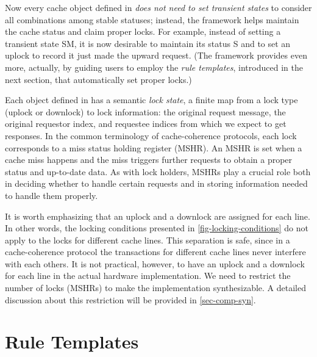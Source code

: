 Now every cache object defined in \hemiola{} \emph{does not need to set transient states} to consider all combinations among stable statuses;
instead, the framework helps maintain the cache status and claim proper locks.
For example, instead of setting a transient state SM, it is now desirable to maintain its status S and to set an uplock to record it just made the upward request.
(The framework provides even more, actually, by guiding users to employ the \emph{rule templates}, introduced in the next section, that automatically set proper locks.)

Each object defined in \hemiola{} has a semantic \emph{lock state}, a finite map from a lock type (uplock or downlock) to lock information: the original request message, the original requestor index, and requestee indices from which we expect to get responses.
In the common terminology of cache-coherence protocols, each lock corresponds to a miss status holding register (MSHR).
An MSHR is set when a cache miss happens and the miss triggers further requests to obtain a proper status and up-to-date data.
As with \hemiola{} lock holders, MSHRs play a crucial role both in deciding whether to handle certain requests and in storing information needed to handle them properly.

It is worth emphasizing that an uplock and a downlock are assigned for each line.
In other words, the locking conditions presented in \autoref{fig-locking-conditions} do not apply to the locks for different cache lines.
This separation is safe, since in a cache-coherence protocol the transactions for different cache lines never interfere with each others.
It is not practical, however, to have an uplock and a downlock for each line in the actual hardware implementation.
We need to restrict the number of locks (MSHRs) to make the implementation synthesizable.
A detailed discussion about this restriction will be provided in \autoref{sec-comp-syn}.

\section{Rule Templates}
\label{sec-rule-templates}

\newcommand{\rtname}[1]{{\small\sf\bf #1}}

\newcommand{\uled}{\ensuremath{\textsf{UL}}}
\newcommand{\dled}{\ensuremath{\textsf{DL}}}
\newcommand{\ulfree}{\ensuremath{\textsf{UL}_{\times}}}
\newcommand{\dlfree}{\ensuremath{\textsf{DL}_{\times}}}

\newcommand{\setul}{\ensuremath{\textsf{UL}\Uparrow}}
\newcommand{\setdl}{\ensuremath{\textsf{DL}\Uparrow}}
\newcommand{\relul}{\ensuremath{\textsf{UL}\Downarrow}}
\newcommand{\reldl}{\ensuremath{\textsf{DL}\Downarrow}}
\newcommand{\stsilent}{\ensuremath{\textsf{SLT}}}

